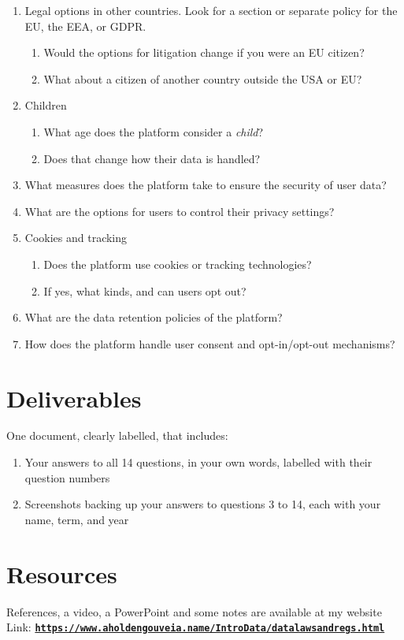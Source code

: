 \documentclass[12pt]{article}
\begin{document}
\begin{enumerate}
\begin{enumerate}
                    \item What steps are detailed in the policies that cover legal recourse for bad practices?
                \end{enumerate}
                \item Legal options in other countries. Look for a section or separate policy for the EU, the EEA, or GDPR.
                \begin{enumerate}
                    \item Would the options for litigation change if you were an EU citizen?
                    \item What about a citizen of another country outside the USA or EU?
                \end{enumerate}
                \item Children
                \begin{enumerate}
                    \item What age does the platform consider a \textit{child}?
                    \item Does that change how their data is handled?
                \end{enumerate}
                \item What measures does the platform take to ensure the security of user data?
                \item What are the options for users to control their privacy settings?
                \item Cookies and tracking
                \begin{enumerate}
                    \item Does the platform use cookies or tracking technologies?
                    \item If yes, what kinds, and can users opt out?
                \end{enumerate}
                \item What are the data retention policies of the platform?
                \item How does the platform handle user consent and opt-in/opt-out mechanisms?
        \end{enumerate}


\section*{Deliverables}

One document, clearly labelled, that includes:
\begin{enumerate}
    \item Your answers to all 14 questions, in your own words, labelled with their question numbers
    \item Screenshots backing up your answers to questions 3 to 14, each with your name, term, and year
\end{enumerate}

\section*{Resources}
References, a video, a PowerPoint and some notes are available at my website
Link: \href{https://www.aholdengouveia.name/IntroData/datalawsandregs.html}{\textbf{\nolinkurl{https://www.aholdengouveia.name/IntroData/datalawsandregs.html}}}
\end{document}
